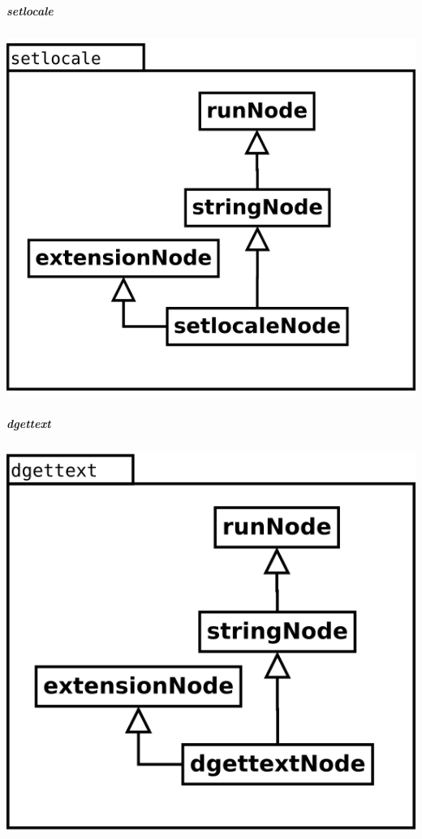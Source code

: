 \begin{multicols}{2}
\subparagraph {setlocale}
\begin{center}
\includegraphics[scale=0.4]{setlocale.png} \\
\end{center}
\subparagraph {dgettext}
\begin{center}
\includegraphics[scale=0.4]{dgettext.png} \\

\end{center}
\end{multicols}
